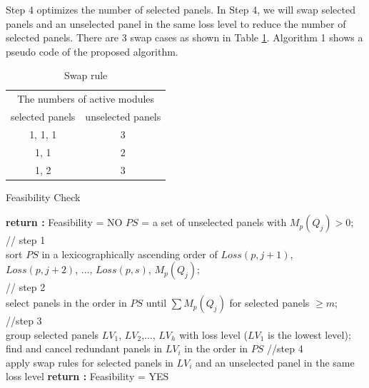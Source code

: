 \documentclass[conference]{pvsctran}
\begin{document}
Step 4 optimizes the number of selected panels.
In Step 4, we will swap selected panels and an unselected panel in the same loss level to reduce the number of selected panels.
There are 3 swap cases as shown in Table \ref{tab:swap}. Algorithm 1 shows a pseudo code of the proposed algorithm.

\begin{table}[t]
\caption{Swap rule}
\label{tab:swap}
\centering
\begin{tabular}{c|c}
\hline\hline
\multicolumn{2}{c}{The numbers of active modules} \\
selected panels & unselected panels \\ \hline
1, 1, 1 & 3 \\ \hline
1, 1 & 2 \\ \hline
1, 2 & 3 \\ \hline
\end{tabular}
\end{table}

\begin{algorithm}
\caption{Feasibility Check}
\LinesNumbered
{}  
    {{
       {\textup{\textbf{return :}} Feasibility = NO}}
     $PS$ = a set of unselected panels with $M_{p}(Q_{j}) > 0$;\\
     // step 1\\
     sort $PS$ in a lexicographically ascending order of $Loss(p,j+1)$, $Loss(p,j+2)$, $\ldots$, $Loss(p,s)$, $M_{p}(Q_{j})$;\\
     // step 2\\
     select panels in the order in $PS$ until $\sum M_{p}(Q_{j})$ for selected panels $\geq m$;\\
     //step 3\\
     group selected panels $LV_{1}$, $LV_{2}$,$\ldots$, $LV_{h}$ with loss level ($LV_{1}$ is the lowest level);\\
     {find and cancel redundant panels in $LV_{i}$ in the order in $PS$}
     //step 4\\
     {apply swap rules for selected panels in $LV_{i}$ and an unselected panel in the same loss level}
    }
    \textup{\textbf{return :}} Feasibility = YES
\end{algorithm}
\end{document}
